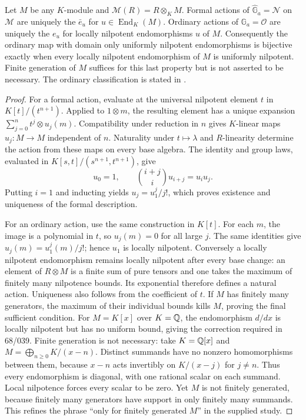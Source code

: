 \begin{theorem}\label{C-qcoh}
Let $M$ be any $K$-module and $\mathcal M(R)=R\otimes_K M$. Formal actions
of $\widehat{\mathbb G}_a=\mathcal N$ on $\mathcal M$ are uniquely the
$\bar e_u$ for $u\in\operatorname{End}_K(M)$. Ordinary actions of
$\mathbb G_a=\mathcal O$ are uniquely the $e_u$ for locally nilpotent
endomorphisms $u$ of $M$. Consequently the ordinary map with domain only
uniformly nilpotent endomorphisms is bijective exactly when every locally
nilpotent endomorphism of $M$ is uniformly nilpotent. Finite generation of
$M$ suffices for this last property but is not asserted to be necessary.
The ordinary classification is stated in
\cite[Chapter VIII, Example 2.1 and footnote 1, p.~113]{MilneAGS}.
\end{theorem}
\begin{proof}
For a formal action, evaluate at the universal nilpotent element $t$ in
$K[t]/(t^{n+1})$. Applied to $1\otimes m$, the resulting element has a
unique expansion
$\sum_{j=0}^{n}t^j\otimes u_j(m)$. Compatibility under reduction in $n$
gives $K$-linear maps $u_j:M\to M$ independent of $n$. Naturality under
$t\mapsto\lambda$ and $R$-linearity determine the action from these maps
on every base algebra. The identity and group laws, evaluated in
$K[s,t]/(s^{n+1},t^{n+1})$, give
\[
 u_0=1,\qquad \binom{i+j}{i}u_{i+j}=u_i u_j.
\]
Putting $i=1$ and inducting yields $u_j=u_1^j/j!$, which proves existence
and uniqueness of the formal description.

For an ordinary action, use the same construction in $K[t]$.
For each $m$, the image is a polynomial in $t$, so $u_j(m)=0$ for all
large $j$. The same identities give $u_j(m)=u_1^j(m)/j!$; hence $u_1$ is
locally nilpotent. Conversely a locally nilpotent endomorphism remains
locally nilpotent after every base change: an element of $R\otimes M$
is a finite sum of pure tensors and one takes the maximum of finitely many
nilpotence bounds. Its exponential therefore defines a natural action.
Uniqueness also follows from the coefficient of $t$. If $M$ has finitely
many generators, the maximum of their individual bounds kills $M$,
proving the final sufficient condition. For $M=K[x]$ over $K={\mathbb{Q}}$, the
endomorphism $d/dx$ is locally nilpotent but has no uniform bound, giving
the correction required in 68/039. Finite generation is not necessary:
take $K={\mathbb{Q}}[x]$ and $M=\bigoplus_{n\geq0}K/(x-n)$. Distinct summands
have no nonzero homomorphisms between them, because $x-n$ acts invertibly
on $K/(x-j)$ for $j\ne n$. Thus every endomorphism is diagonal, with
one rational scalar on each summand. Local nilpotence forces every scalar
to be zero. Yet $M$ is not finitely generated, because finitely many
generators have support in only finitely many summands. This refines the
phrase ``only for finitely generated $M$'' in the supplied study.
\end{proof}

